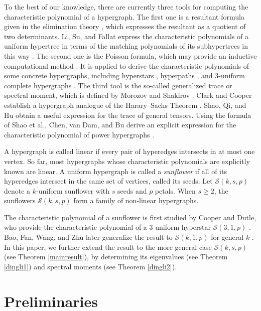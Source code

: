 \documentclass{article}
\begin{document}
To the best of our knowledge, there are currently three tools for computing the characteristic polynomial of a hypergraph.
The first one is a resultant formula given in the elimination theory \cite{macaulay1902some},
which expresses the resultant as a quotient of two determinants.
Li, Su, and Fallat express the characteristic polynomials of a uniform hypertree in terms of the matching polynomials of its subhypertrees in this way \cite{li2024hypertree}.
The second one is the Poisson formula, which may provide an inductive computational method \cite{jouanolou1991formalisme}.
It is applied to derive the characteristic polynomials of some concrete hypergraphs, including hyperstars \cite{bao2020combinatorial}, hyperpaths \cite{chen2021reduction}, and $3$-uniform complete hypergraphs \cite{zheng2021complete}.
The third tool is the so-called generalized trace or spectral moment,
which is defined by Morozov and Shakirov \cite{morozov2011analogue}.
Clark and Cooper establish a hypergraph analogue of the Harary–Sachs Theorem \cite{clark2021harary}.
Shao, Qi, and Hu \cite{shao2015some} obtain a useful expression for the trace of general tensors.
Using the formula of Shao et al.,
Chen, van Dam, and Bu derive an explicit expression for the characteristic polynomial of power hypergraphs \cite{chen2024spectra}.

A hypergraph is called linear if every pair of hyperedges intersects in at most one vertex.
So far,
most hypergraphs whose characteristic polynomials are explicitly known are linear.
A uniform hypergraph is called a \emph{sunflower} if all of its hyperedges intersect in the same set of vertices, called its seeds.
Let $\mathcal{S}(k,s,p)$ denote a $k$-uniform sunflower with $s$ seeds and $p$ petals.
When $s \geq 2$, the sunflowers $\mathcal{S}(k,s,p)$ form a family of non-linear hypergraphs.


The characteristic polynomial of a sunflower is first studied by Cooper and Dutle,
who provide the characteristic polynomial of a $3$-uniform hyperstar $\mathcal{S}(3,1,p)$ \cite{cooper2015computing}.
Bao, Fan, Wang, and Zhu later generalize the result to $\mathcal{S}(k,1,p)$ for general $k$ \cite{bao2020combinatorial}.
In this paper, we further extend the result to the more general case $\mathcal{S}(k,s,p)$ (see Theorem \ref{mainresult}),
by determining its eigenvalues (see Theorem \ref{dingli1}) and spectral moments (see Theorem \ref{dingli2}).



\section{Preliminaries}
\end{document}
